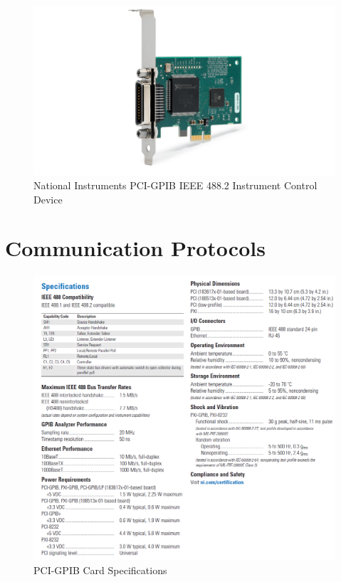 \documentclass[12pt, titlepage]{article}
\begin{document}
\begin{figure}[H]
\centerline{\includegraphics[scale=0.25]{4.png}}
\caption{National Instruments PCI-GPIB IEEE 488.2 Instrument Control Device}
\label{fig}
\end{figure}

\section{Communication Protocols}
\label{Apx.D}

\begin{figure}[H]
\centerline{\includegraphics[scale=1]{specs.png}}
\caption{PCI-GPIB Card Specifications}
\label{fig}
\end{figure}
\end{document}
